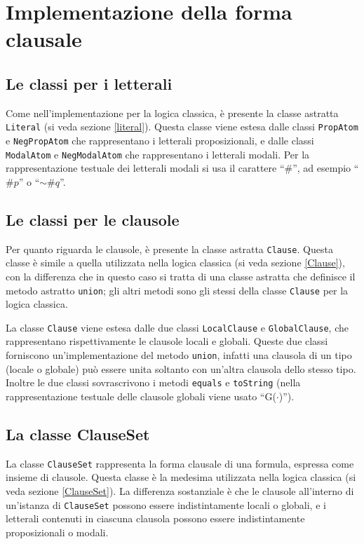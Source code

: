 \documentclass[a4paper,12pt]{report}
\begin{document}
\section{Implementazione della forma clausale}
\subsection*{Le classi per i letterali}
Come nell'implementazione per la logica classica, è presente la classe astratta \texttt{Literal} (si veda sezione \ref{literal}). Questa classe viene estesa dalle classi \texttt{PropAtom} e \texttt{NegPropAtom} che rappresentano i letterali proposizionali, e dalle classi \texttt{ModalAtom} e \texttt{NegModalAtom} che rappresentano i letterali modali. Per la rappresentazione testuale dei letterali modali si usa il carattere ``$\#$'', ad esempio ``$\#p$'' o ``$\sim\!\#q$''.

\subsection*{Le classi per le clausole}
Per quanto riguarda le clausole, è presente la classe astratta \texttt{Clause}. Questa classe è simile a quella utilizzata nella logica classica (si veda sezione \ref{Clause}), con la differenza che in questo caso si tratta di una classe astratta che definisce il metodo astratto \texttt{union}; gli altri metodi sono gli stessi della classe \texttt{Clause} per la logica classica.

La classe \texttt{Clause} viene estesa dalle due classi \texttt{LocalClause} e \texttt{GlobalClause}, che rappresentano rispettivamente le clausole locali e globali. Queste due classi forniscono un'implementazione del metodo \texttt{union}, infatti una clausola di un tipo (locale o globale) può essere unita soltanto con un'altra clausola dello stesso tipo. Inoltre le due classi sovrascrivono i metodi \texttt{equals} e \texttt{toString} (nella rappresentazione testuale delle clausole globali viene usato ``G($\cdot$)'').

\subsection*{La classe ClauseSet}
La classe \texttt{ClauseSet} rappresenta la forma clausale di una formula, espressa come insieme di clausole. Questa classe è la medesima utilizzata nella logica classica (si veda sezione \ref{ClauseSet}). La differenza sostanziale è che le clausole all'interno di un'istanza di \texttt{ClauseSet} possono essere indistintamente locali o globali, e i letterali contenuti in ciascuna clausola possono essere indistintamente proposizionali o modali.
\end{document}
